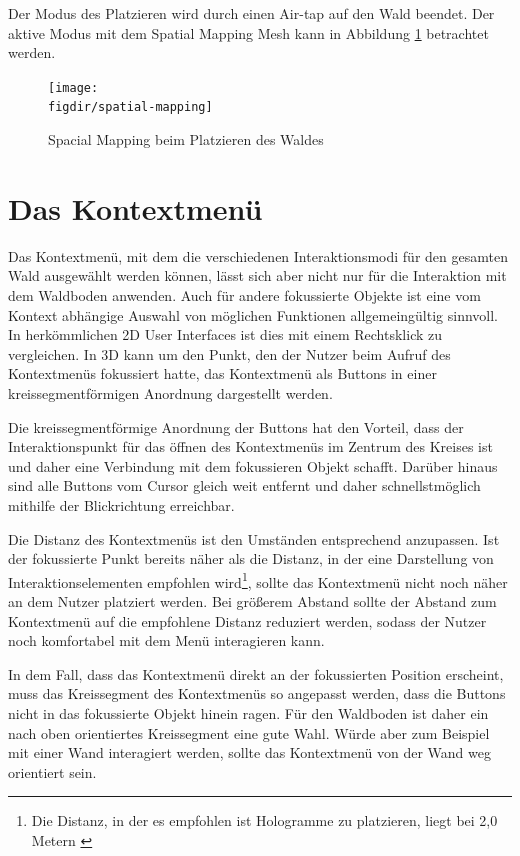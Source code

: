 Der Modus des Platzieren wird durch einen Air-tap auf den Wald beendet. Der aktive Modus mit dem Spatial Mapping Mesh kann in Abbildung \ref{fig:spatial-mapping} betrachtet werden.

\begin{figure}[htb]
  \texttt{[image: \\figdir/spatial-mapping]}
  \caption{Spacial Mapping beim Platzieren des Waldes}
  \label{fig:spatial-mapping}
\end{figure}

\section{Das Kontextmenü}
Das Kontextmenü, mit dem die verschiedenen Interaktionsmodi für den gesamten Wald ausgewählt werden können, lässt sich aber nicht nur für die Interaktion mit dem Waldboden anwenden. Auch für andere fokussierte Objekte ist eine vom Kontext abhängige Auswahl von möglichen Funktionen allgemeingültig sinnvoll. In herkömmlichen 2D User Interfaces ist dies mit einem Rechtsklick zu vergleichen. In 3D kann um den Punkt, den der Nutzer beim Aufruf des Kontextmenüs fokussiert hatte, das Kontextmenü als Buttons in einer kreissegmentförmigen Anordnung dargestellt werden.

Die kreissegmentförmige Anordnung der Buttons hat den Vorteil, dass der Interaktionspunkt für das öffnen des Kontextmenüs im Zentrum des Kreises ist und daher eine Verbindung mit dem fokussieren Objekt schafft. Darüber hinaus sind alle Buttons vom Cursor gleich weit entfernt und daher schnellstmöglich mithilfe der Blickrichtung erreichbar.

Die Distanz des Kontextmenüs ist den Umständen entsprechend anzupassen. Ist der fokussierte Punkt bereits näher als die Distanz, in der eine Darstellung von Interaktionselementen empfohlen wird\footnote{Die Distanz, in der es empfohlen ist Hologramme zu platzieren, liegt bei 2,0 Metern \cite{windows2017interaction}}, sollte das Kontextmenü nicht noch näher an dem Nutzer platziert werden. Bei größerem Abstand sollte der Abstand zum Kontextmenü auf die empfohlene Distanz reduziert werden, sodass der Nutzer noch komfortabel mit dem Menü interagieren kann.

In dem Fall, dass das Kontextmenü direkt an der fokussierten Position erscheint, muss das Kreissegment des Kontextmenüs so angepasst werden, dass die Buttons nicht in das fokussierte Objekt hinein ragen. Für den Waldboden ist daher ein nach oben orientiertes Kreissegment eine gute Wahl. Würde aber zum Beispiel mit einer Wand interagiert werden, sollte das Kontextmenü von der Wand weg orientiert sein.

